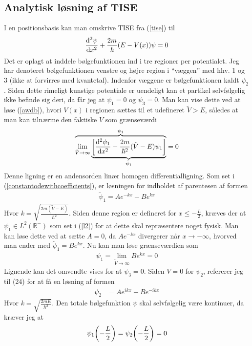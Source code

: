 \documentclass[12pt]{article}
\theoremstyle{definition}
\theoremstyle{remark}
\theoremstyle{definition}
\numberwithin{equation}{section}
\begin{document}
\subsection{Analytisk løsning af TISE}
I en positionsbasis kan man omskrive TISE fra (\ref{tise}) til
\begin{align}
     \label{awdb}
    \dv[2]{\psi}{x}+\frac{2m}{\hbar}(E-V(x))\psi = 0
\end{align}
Det er oplagt at inddele bølgefunktionen ind i tre regioner per potentialet. Jeg har denoteret bølgefunktionen venstre og højre region i ``væggen'' med hhv. 1 og 3 (ikke at forvirres med kvantetal). Indenfor væggene er bølgefunktionen kaldt $\psi_2$. Siden dette rimeligt kunstige potentiale er uendeligt kan et partikel selvfølgelig ikke befinde sig deri, da får jeg at $\psi_1=0$ og $\psi_3=0$. Man kan vise dette ved at løse (\ref{awdb}), hvori $V(x)$ i regionen sættes til et udefineret $\tilde V>E$, således at man kan tilnærme den faktiske $V$ som grænseværdi
\begin{align}
    \overbrace{
    \lim_{\tilde V\rightarrow \infty} \underbrace{\qty[\dv[2]{\psi_1}{x}-\frac{2m}{\hbar^2}(\tilde V-E)\psi_1]}_{\tilde \psi_1}}^{\psi_1} = 0
\end{align}
Denne ligning er en andensorden linær homogen differentialligning. Som set i (\ref{constantodewithcoefficients}), er løsningen for indholdet af parentesen af formen
\begin{align}
    \tilde \psi_1 = Ae^{-kx}+Be^{kx}
\end{align}
Hvor $\displaystyle k = \sqrt{\frac{2m(\tilde V-E)}{\hbar^2}}$. Siden denne region er defineret for $x\leq-\frac{L}{2}$, kræves der at $\psi_1\in L^2(\mathbb R^-)$ som set i (\ref{l2}) for at dette skal repræsentere noget fysisk. Man kan løse dette ved at sætte $A=0$, da $Ae^{-kx}$ divergerer når $x\to -\infty$, hvorved man ender med $\tilde \psi_1=Be^{kx}$. Nu kan man løse grænseværdien som
\begin{align}
    \psi_1 = \lim_{\tilde V\to \infty } Be^{kx} = 0
\end{align}
Lignende kan det omvendte vises for at $\psi_3=0$. Siden $V=0$ for $\psi_2$, refererer jeg til (24) for at få en løsning af formen
\begin{align}
\label{mid}
    \psi_2 &= Ae^{ikx}+Be^{-ikx}
\end{align}
Hvor $\displaystyle k = \sqrt{\frac{2mE}{\hbar^2}}$. Den totale bølgefunktion $\psi$ skal selvfølgelig være kontinuer, da kræver jeg at
\begin{align}
\label{betingelsea}
    \psi_1\qty(-\frac{L}{2})=\psi_2\qty(-\frac{L}{2})=0
\end{align}
\end{document}
